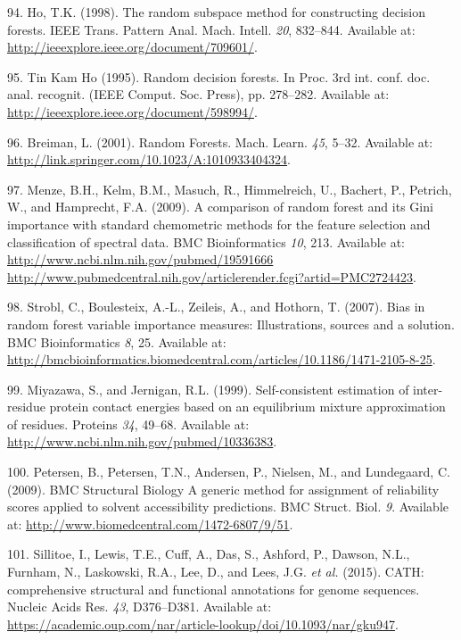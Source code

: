 \documentclass[12pt,a4paper,twoside]{book}
\theoremstyle{definition}
\theoremstyle{definition}
\theoremstyle{remark}
\begin{document}
\hypertarget{ref-Ho1998}{}
94. Ho, T.K. (1998). The random subspace method for constructing
decision forests. IEEE Trans. Pattern Anal. Mach. Intell. \emph{20},
832--844. Available at:
\url{http://ieeexplore.ieee.org/document/709601/}.

\hypertarget{ref-TinKamHo}{}
95. Tin Kam Ho (1995). Random decision forests. In Proc. 3rd int. conf.
doc. anal. recognit. (IEEE Comput. Soc. Press), pp. 278--282. Available
at: \url{http://ieeexplore.ieee.org/document/598994/}.

\hypertarget{ref-Breiman2001}{}
96. Breiman, L. (2001). Random Forests. Mach. Learn. \emph{45}, 5--32.
Available at: \url{http://link.springer.com/10.1023/A:1010933404324}.

\hypertarget{ref-Menze2009}{}
97. Menze, B.H., Kelm, B.M., Masuch, R., Himmelreich, U., Bachert, P.,
Petrich, W., and Hamprecht, F.A. (2009). A comparison of random forest
and its Gini importance with standard chemometric methods for the
feature selection and classification of spectral data. BMC
Bioinformatics \emph{10}, 213. Available at:
\href{http://www.ncbi.nlm.nih.gov/pubmed/19591666\%20http://www.pubmedcentral.nih.gov/articlerender.fcgi?artid=PMC2724423}{http://www.ncbi.nlm.nih.gov/pubmed/19591666 http://www.pubmedcentral.nih.gov/articlerender.fcgi?artid=PMC2724423}.

\hypertarget{ref-Strobl2007}{}
98. Strobl, C., Boulesteix, A.-L., Zeileis, A., and Hothorn, T. (2007).
Bias in random forest variable importance measures: Illustrations,
sources and a solution. BMC Bioinformatics \emph{8}, 25. Available at:
\url{http://bmcbioinformatics.biomedcentral.com/articles/10.1186/1471-2105-8-25}.

\hypertarget{ref-Miyazawa1999a}{}
99. Miyazawa, S., and Jernigan, R.L. (1999). Self-consistent estimation
of inter-residue protein contact energies based on an equilibrium
mixture approximation of residues. Proteins \emph{34}, 49--68. Available
at: \url{http://www.ncbi.nlm.nih.gov/pubmed/10336383}.

\hypertarget{ref-Petersen2009a}{}
100. Petersen, B., Petersen, T.N., Andersen, P., Nielsen, M., and
Lundegaard, C. (2009). BMC Structural Biology A generic method for
assignment of reliability scores applied to solvent accessibility
predictions. BMC Struct. Biol. \emph{9}. Available at:
\url{http://www.biomedcentral.com/1472-6807/9/51}.

\hypertarget{ref-Sillitoe2015}{}
101. Sillitoe, I., Lewis, T.E., Cuff, A., Das, S., Ashford, P., Dawson,
N.L., Furnham, N., Laskowski, R.A., Lee, D., and Lees, J.G. \emph{et
al.} (2015). CATH: comprehensive structural and functional annotations
for genome sequences. Nucleic Acids Res. \emph{43}, D376--D381.
Available at:
\url{https://academic.oup.com/nar/article-lookup/doi/10.1093/nar/gku947}.
\end{document}
